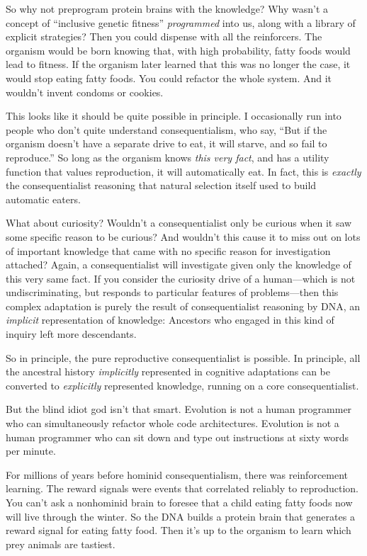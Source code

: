 {
 So why not preprogram protein brains with the knowledge? Why
wasn't a concept of ``inclusive
genetic fitness'' \textit{programmed} into us, along
with a library of explicit strategies? Then you could dispense with all
the reinforcers. The organism would be born knowing that, with high
probability, fatty foods would lead to fitness. If the organism later
learned that this was no longer the case, it would stop eating fatty
foods. You could refactor the whole system. And it
wouldn't invent condoms or cookies.}

{
 This looks like it should be quite possible in principle. I
occasionally run into people who don't quite understand
consequentialism, who say, ``But if the organism
doesn't have a separate drive to eat, it will starve,
and so fail to reproduce.'' So long as the organism
knows \textit{this very fact}, and has a utility function that values
reproduction, it will automatically eat. In fact, this is
\textit{exactly} the consequentialist reasoning that natural selection
itself used to build automatic eaters.}

{
 What about curiosity? Wouldn't a consequentialist
only be curious when it saw some specific reason to be curious? And
wouldn't this cause it to miss out on lots of important
knowledge that came with no specific reason for investigation attached?
Again, a consequentialist will investigate given only the knowledge of
this very same fact. If you consider the curiosity drive of a
human---which is not undiscriminating, but responds to particular
features of problems---then this complex adaptation is purely the
result of consequentialist reasoning by DNA, an \textit{implicit}
representation of knowledge: Ancestors who engaged in this kind of
inquiry left more descendants.}

{
 So in principle, the pure reproductive consequentialist is
possible. In principle, all the ancestral history \textit{implicitly}
represented in cognitive adaptations can be converted to
\textit{explicitly} represented knowledge, running on a core
consequentialist.}

{
 But the blind idiot god isn't that smart.
Evolution is not a human programmer who can simultaneously refactor
whole code architectures. Evolution is not a human programmer who can
sit down and type out instructions at sixty words per minute.}

{
 For millions of years before hominid consequentialism, there was
reinforcement learning. The reward signals were events that correlated
reliably to reproduction. You can't ask a nonhominid
brain to foresee that a child eating fatty foods now will live through
the winter. So the DNA builds a protein brain that generates a reward
signal for eating fatty food. Then it's up to the
organism to learn which prey animals are tastiest.}

